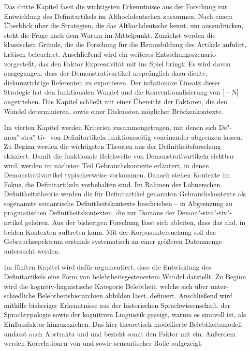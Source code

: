 Das dritte Kapitel fasst die wichtigsten Erkenntnisse aus der Forschung zur Entwicklung des Definitartikels  im Althochdeutschen zusammen. Nach einem Überblick über die Strategien, die das Althochdeutsche kennt, um  auszudrücken, steht die Frage nach dem Warum im Mittelpunkt. Zunächst werden die klassischen Gründe, die die Forschung für die Herausbildung des Artikels anführt, kritisch beleuchtet. Anschließend wird ein weiteres Entstehungsszenario vorgestellt, das den Faktor Expressivität mit ins Spiel bringt: Es wird davon ausgegangen, dass der Demonstrativartikel  ursprünglich dazu diente, diskurswichtige Referenten zu exponieren. Der inflationäre Einsatz dieser Strategie hat den funktionalen Wandel und die Konventionalisierung von [\,+\,N] angetrieben. Das Kapitel schließt mit einer Übersicht der Faktoren, die den Wandel determinieren, sowie einer Diskussion möglicher Brückenkontexte. 

Im vierten Kapitel werden Kriterien zusammengetragen, mit denen sich De"-mon"-stra"-tiv- von Definitartikeln funktionsseitig voneinander abgrenzen lassen. Zu Beginn werden die wichtigsten Theorien aus der Definitheitsforschung  skizziert. Damit die funktionale Reichweite von Demonstrativartikeln  sichtbar wird, werden im nächsten Teil Gebrauchskontexte erläutert, in denen Demonstrativ\-artikel typischerweise vorkommen. Danach stehen Kontexte im Fokus, die  Definitartikeln vorbehalten sind. 
Im Rahmen der Löbnerschen Definitheitstheorie \parencite{Lobner1985}  werden die für Definitartikel genannten Gebrauchskontexte als sogenannte semantische  Definitheitskontexte  beschrieben -- in Abgrenzung zu  pragmatischen Definitheitskontexten, die zur Domäne der Demon"-stra"-tiv"-artikel  gehören. Aus der bisherigen Forschung lässt sich ableiten, dass das ahd.  in beiden Kontexten auftreten kann. Mit der Korpusuntersuchung  soll das Gebrauchsspektrum erstmals systematisch an einer größeren Datenmenge untersucht werden. 

Im fünften Kapitel wird dafür argumentiert, dass die Entwicklung des Definitartikels  eine Form von belebtheitsgesteuertem Wandel darstellt. Zu Beginn wird die kognitiv-linguistische Kategorie Belebtheit, welche sich über unter-\linebreak schiedliche Belebtheitshierarchien abbilden lässt, definiert. Anschließend wird mithilfe bisheriger Erkenntnisse aus der historischen Sprachwissenschaft, der Sprachtypologie sowie der kognitiven Linguistik gezeigt, warum es sinnvoll ist,  als Einflussfaktor hinzuzuziehen. Das hier theoretisch modellierte Belebtheitsmodell umfasst auch Abstrakta 
und  und bezieht somit den Faktor  mit ein. Außerdem werden Korrelationen von  und  sowie semantischer Rolle  aufgezeigt.

